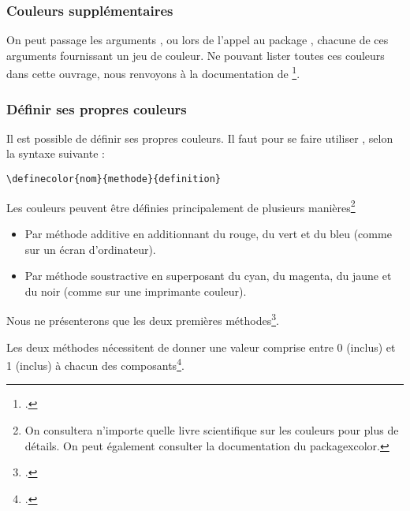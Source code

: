 \subsubsection{Couleurs supplémentaires}

On peut passage les arguments ,  ou  lors de l'appel au package , chacune de ces arguments fournissant un jeu de couleur. Ne pouvant lister toutes ces couleurs dans cette ouvrage, nous renvoyons à la documentation de \footcite{xcolor_jeu}.

\subsubsection{Définir ses propres couleurs}

Il est possible de définir ses propres couleurs. Il faut pour se faire utiliser , selon la syntaxe suivante :

\begin{verbatim}
\definecolor{nom}{methode}{definition}
\end{verbatim}

Les couleurs peuvent être définies principalement de plusieurs manières\footnote{On consultera n'importe quelle livre scientifique sur les couleurs pour plus de détails. On peut également consulter la documentation du package{xcolor}.}
\begin{itemize}
\item Par méthode additive en additionnant du rouge, du vert et du bleu (comme sur un écran d'ordinateur).
\item Par méthode soustractive en superposant du cyan, du magenta, du jaune et du noir (comme sur une imprimante couleur).
\end{itemize}
Nous ne présenterons que les deux premières méthodes\footcite[Il existe aussi la méthode de définition par la longueur d'onde pour les couleurs de l'arc en ciel, par pourcentage de gris pour les différents niveaux de gris, ainsi que par teinte, saturation et luminosité, mais ceci nécessiterait un cours de physique lumineuse. Pour  les personnes intéressés par les détails, consulter][]{xcolor_methode}.

Les deux méthodes nécessitent de donner une valeur comprise entre 0 (inclus) et 1 (inclus) à chacun des composants\footcite[On pourra trouver une série de code couleur sur le site][]{codecouleur}.



